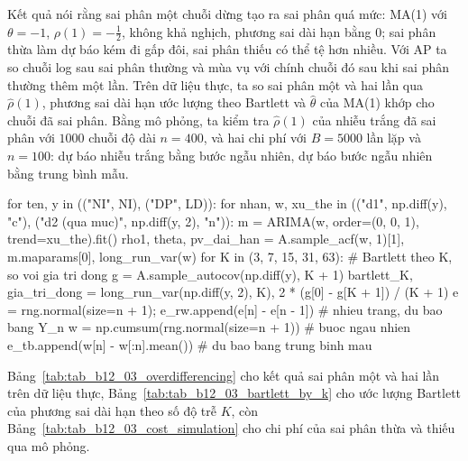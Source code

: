  Kết quả  nói rằng sai phân một chuỗi dừng tạo ra sai phân quá mức: MA(1) với $\theta=-1$, $\rho(1)=-\tfrac12$, không khả nghịch, phương sai dài hạn bằng $0$; sai phân thừa làm dự báo kém đi gấp đôi, sai phân thiếu có thể tệ hơn nhiều.
 Với AP ta so chuỗi log sau sai phân thường và mùa vụ với chính chuỗi đó sau khi sai phân thường thêm một lần. Trên dữ liệu thực, ta so sai phân một và hai lần qua $\hat\rho(1)$, phương sai dài hạn ước lượng theo Bartlett và $\hat\theta$ của MA(1) khớp cho chuỗi đã sai phân. Bằng mô phỏng, ta kiểm tra $\hat\rho(1)$ của nhiễu trắng đã sai phân với $1000$ chuỗi độ dài $n=400$, và hai chi phí với $B=5000$ lần lặp và $n=100$: dự báo nhiễu trắng bằng bước ngẫu nhiên, dự báo bước ngẫu nhiên bằng trung bình mẫu.
\begin{codeblock}
for ten, y in (("NI", NI), ("DP", LD)):
    for nhan, w, xu_the in (("d1", np.diff(y), "c"), ("d2 (qua muc)", np.diff(y, 2), "n")):
        m = ARIMA(w, order=(0, 0, 1), trend=xu_the).fit()
        rho1, theta, pv_dai_han = A.sample_acf(w, 1)[1], m.maparams[0], long_run_var(w)
    for K in (3, 7, 15, 31, 63):                                # Bartlett theo K, so voi gia tri dong
        g = A.sample_autocov(np.diff(y), K + 1)
        bartlett_K, gia_tri_dong = long_run_var(np.diff(y, 2), K), 2 * (g[0] - g[K + 1]) / (K + 1)
e = rng.normal(size=n + 1); e_rw.append(e[n] - e[n - 1])      # nhieu trang, du bao bang Y_n
w = np.cumsum(rng.normal(size=n + 1))                         # buoc ngau nhien
e_tb.append(w[n] - w[:n].mean())                              # du bao bang trung binh mau
\end{codeblock}
 Bảng~\ref{tab:tab_b12_03_overdifferencing} cho kết quả sai phân một và hai lần trên dữ liệu thực, Bảng~\ref{tab:tab_b12_03_bartlett_by_k} cho ước lượng Bartlett của phương sai dài hạn theo số độ trễ $K$, còn Bảng~\ref{tab:tab_b12_03_cost_simulation} cho chi phí của sai phân thừa và thiếu qua mô phỏng.
